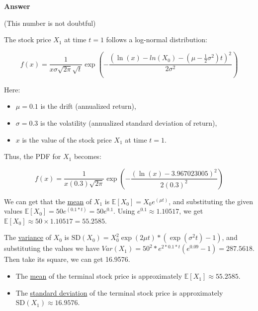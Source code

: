 \documentclass[letterpaper]{article}
\begin{document}
		\textbf{Answer}
		
		(This number is not doubtful)
			
			The stock price \( X_1 \) at time \( t = 1 \) follows a log-normal distribution:
			
			\[
			f(x) = \frac{1}{x \sigma \sqrt{2 \pi}\sqrt{t}} \exp\left( -\frac{\left( \ln(x) -ln(X_0)- \left( \mu - \frac{1}{2} \sigma^2 \right)t \right)^2}{2 \sigma^2} \right)
			\]
			
			Here:
			\begin{itemize}
				\item \( \mu = 0.1 \) is the drift (annualized return),
				\item \( \sigma = 0.3 \) is the volatility (annualized standard deviation of return),
				\item \( x \) is the value of the stock price \( X_1 \) at time \( t = 1 \).
			\end{itemize}
			
			Thus, the PDF for \( X_1 \) becomes:
			
			\[
			f(x) = \frac{1}{x (0.3) \sqrt{2 \pi}} \exp\left( -\frac{(\ln(x) -3.967023005)^2}{2 (0.3)^2} \right)
			\]
			
			We can get that the \underline{mean} of \( X_1 \) is $\mathbb{E}[X_0] = X_0 e^{( \mu t )}$, and substituting the given values $	\mathbb{E}[X_0] = 50e^{( 0.1 * t)} = 50 e^{0.1}$. Using \(e^{0.1} \approx 1.10517 \), we get $\mathbb{E}[X_0] \approx 50 \times 1.10517 = 55.2585$. 
			
			The \underline{variance} of \( X_0\) is $
			\text{SD}(X_0) = X_0^2 \exp( 2\mu t)*(\exp(\sigma^2t)-1)$, and substituting the values we have $Var(X_1)=50^2*e^{2*0.1*t}(e^{0.09}-1)=287.5618$. Then take its square, we can get 16.9576.
			
			
			\begin{itemize}
				\item The \underline{mean} of the terminal stock price is approximately \( \mathbb{E}[X_1] \approx 55.2585\).
				\item The \underline{standard deviation} of the terminal stock price is approximately \( \text{SD}(X_1) \approx 16.9576\).
			\end{itemize}
			
		
		
		
		
		
	
\end{document}
